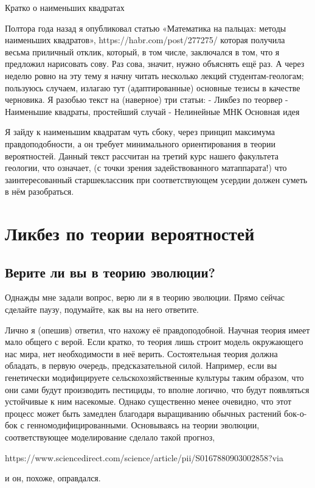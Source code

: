 \documentclass[A4,11pt]{article}
\begin{document}
Кратко о наименьших квадратах

Полтора года назад я опубликовал статью «Математика на пальцах: методы наименьших квадратов»,
https://habr.com/post/277275/
которая получила весьма приличный отклик,
который, в том числе, заключался в том, что я предложил нарисовать сову.
Раз сова, значит, нужно объяснять ещё раз. А через неделю ровно на эту тему я начну читать несколько лекций студентам-геологам;
пользуюсь случаем, излагаю тут (адаптированные) основные тезисы в качестве черновика.
Я разобью текст на (наверное) три статьи:
- Ликбез по теорвер
- Наименьшие квадраты, простейший случай
- Нелинейные МНК
Основная идея


Я зайду к наименьшим квадратам чуть сбоку, через принцип максимума правдоподобности, а он требует минимального ориентирования в теории вероятностей.
Данный текст рассчитан на третий курс нашего факультета геологии, что означает, (с точки зрения задействованного матаппарата!) что заинтересованный старшеклассник 
при соответствующем усердии должен суметь в нём разобраться.

\section{Ликбез по теории вероятностей}
\subsection{Верите ли вы в теорию эволюции?}
Однажды мне задали вопрос, верю ли я в теорию эволюции. Прямо сейчас сделайте паузу, подумайте, как вы на него ответите.

Лично я (опешив) ответил, что нахожу её правдоподобной. Научная теория имеет мало общего с верой.
Если кратко, то теория лишь строит модель окружающего нас мира, нет необходимости в неё верить.
Состоятельная теория должна обладать, в первую очередь, предсказательной силой.
Например, если вы генетически модифицируете сельскохозяйственные культуры таким образом, что они сами будут производить пестициды,
то вполне логично, что будут появляться устойчивые к ним насекомые.
Однако существенно менее очевидно, что этот процесс может быть замедлен благодаря выращиванию обычных растений бок-о-бок с генномодифицированными.
Основываясь на теории эволюции, соответствующее моделирование сделало такой прогноз,

https://www.sciencedirect.com/science/article/pii/S0167880903002858?via%

и он, похоже, оправдался.
\end{document}
